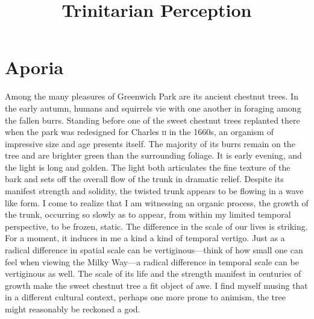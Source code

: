 \documentclass[12pt]{article}
\title{Trinitarian Perception}
\author{\myauthor}
\date{} %
\begin{document}
\maketitle

\setlength{\parindent}{1em}


\section{Aporia} %
\label{sec:aporia}

Among the many pleasures of Greenwich Park are its ancient chestnut trees. In the early autumn, humans and squirrels vie with one another in foraging among the fallen burrs. Standing before one of the sweet chestnut trees replanted there when the park was redesigned for Charles \textsc{ii} in the 1660s, an organism of impressive size and age presents itself. The majority of its burrs remain on the tree and are brighter green than the surrounding foliage. It is early evening, and the light is long and golden. The light both articulates the fine texture of the bark and sets off the overall flow of the trunk in dramatic relief. Despite its manifest strength and solidity, the twisted trunk appears to be flowing in a wave like form. I come to realize that I am witnessing an organic process, the growth of the trunk, occurring so slowly as to appear, from within my limited temporal perspective, to be frozen, static. The difference in the scale of our lives is striking. For a moment, it induces in me a kind a kind of temporal vertigo.  Just as a radical difference in spatial scale can be vertiginous---think of how small one can feel when viewing the Milky Way---a radical difference in temporal scale can be vertiginous as well. The scale of its life and the strength manifest in centuries of growth make the sweet chestnut tree a fit object of awe. I find myself musing that in a different cultural context, perhaps one more prone to animism, the tree might reasonably be reckoned a god. 
\end{document}
